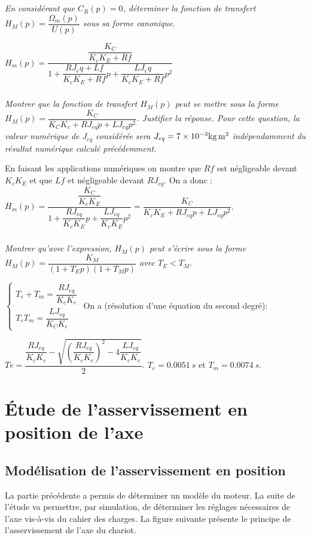 \documentclass[10pt,fleqn]{article} %
\begin{document}
\begin{multicols}{2}
\subparagraph{}
\textit{En considérant que $C_R (p)=0$, déterminer la fonction de transfert $H_M (p)=\dfrac{\Omega_m (p)}{U(p)}$ sous sa forme canonique.}
\ifprof
\begin{corrige}
$H_m (p)=\dfrac{\dfrac{K_C}{K_c K_E+Rf}}{1+\dfrac{RJ_eq+Lf}{K_c K_E+Rf}p+\dfrac{LJ_eq}{K_c K_E+Rf} p^2}$
\end{corrige}
\else
\fi

\subparagraph{}
\textit{Montrer que la fonction de transfert $H_M (p)$ peut se mettre sous la forme $H_M (p)=\dfrac{K_C}{K_C K_e+RJ_{eq} p+LJ_{eq} p^2 }$. Justifier la réponse. Pour cette question, la valeur numérique de $J_{eq}$ considérée sera $J_{eq}=\num{7d-3}\si{kg.m^2}$ indépendamment du résultat numérique calculé précédemment.}
\ifprof
\begin{corrige}
En faisant les applications numériques on montre que $Rf$ est négligeable devant $K_c K_E$ et que $Lf$ et négligeable devant $RJ_{eq}$. On a donc : 
$H_m (p)=\dfrac{\dfrac{K_C}{K_c K_E}}{1+\dfrac{RJ_{eq}}{K_c K_E }p+\dfrac{LJ_{eq}}{K_c K_E }p^2 }=\dfrac{K_C}{K_c K_E+RJ_{eq} p+LJ_{eq} p^2 }$.

\end{corrige}
\else
\fi

\subparagraph{}
\textit{Montrer qu'avec l'expression, $H_M (p)$ peut s'écrire sous la forme $H_M (p)=\dfrac{K_M}{(1+T_E p)(1+T_M p)}$  avec $T_E<T_M$.}
\ifprof
\begin{corrige}
$
\left\{
\begin{array}{l}
T_e+T_m= \dfrac{RJ_{eq}}{K_c K_e}\\
T_e T_m=\dfrac{LJ_{eq}}{K_C K_e}
\end{array}
\right.
$
On a (résolution d’une équation du second degré):

$Te=\dfrac{\dfrac{RJ_{eq}}{K_c K_e}-\sqrt{\left(\dfrac{RJ_{eq}}{K_c K_e}\right)^2 - 4\dfrac{LJ_{eq}}{K_c K_e}}}{2}$. $T_e=\SI{0,0051}{s}$ et $T_m=\SI{0,0074}{s}$.


\end{corrige}
\else
\fi
\section*{Étude de l'asservissement en position de l'axe}
\subsection*{Modélisation de l'asservissement en position}
\ifprof
\else


La partie précédente a permis de déterminer un modèle du moteur. La suite de l'étude va permettre, par simulation, de déterminer les réglages nécessaires de l'axe vis-à-vis du cahier des charges. La figure suivante présente le principe de l'asservissement de l'axe du chariot.
 

\end{multicols}
\end{document}
